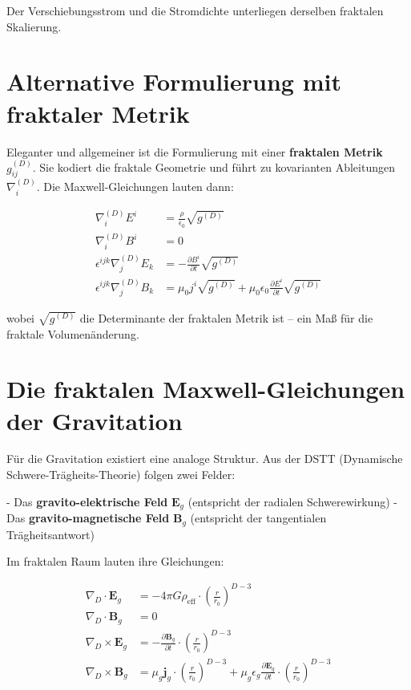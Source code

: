 \documentclass[12pt,a4paper]{article}
\begin{document}
Der Verschiebungsstrom und die Stromdichte unterliegen derselben fraktalen Skalierung.

\section{Alternative Formulierung mit fraktaler Metrik}

Eleganter und allgemeiner ist die Formulierung mit einer \textbf{fraktalen Metrik} \(g_{ij}^{(D)}\). Sie kodiert die fraktale Geometrie und führt zu kovarianten Ableitungen \(\nabla_i^{(D)}\). Die Maxwell-Gleichungen lauten dann:

\[
\begin{align}
\nabla_i^{(D)} E^i &= \frac{\rho}{\epsilon_0} \sqrt{g^{(D)}} \tag{1}\\
\nabla_i^{(D)} B^i &= 0 \tag{2}\\
\epsilon^{ijk} \nabla_j^{(D)} E_k &= -\frac{\partial B^i}{\partial t} \sqrt{g^{(D)}} \tag{3}\\
\epsilon^{ijk} \nabla_j^{(D)} B_k &= \mu_0 j^i \sqrt{g^{(D)}} + \mu_0 \epsilon_0 \frac{\partial E^i}{\partial t} \sqrt{g^{(D)}} \tag{4}
\end{align}
\]

wobei \(\sqrt{g^{(D)}}\) die Determinante der fraktalen Metrik ist – ein Maß für die fraktale Volumenänderung.

\section{Die fraktalen Maxwell-Gleichungen der Gravitation}

Für die Gravitation existiert eine analoge Struktur. Aus der DSTT (Dynamische Schwere-Trägheits-Theorie) folgen zwei Felder:

- Das \textbf{gravito-elektrische Feld} \(\mathbf{E}_g\) (entspricht der radialen Schwerewirkung)
- Das \textbf{gravito-magnetische Feld} \(\mathbf{B}_g\) (entspricht der tangentialen Trägheitsantwort)

Im fraktalen Raum lauten ihre Gleichungen:

\[
\begin{align}
\nabla_D \cdot \mathbf{E}_g &= -4\pi G \rho_{\text{eff}} \cdot \left( \frac{r}{r_0} \right)^{D-3} \tag{5}\\
\nabla_D \cdot \mathbf{B}_g &= 0 \tag{6}\\
\nabla_D \times \mathbf{E}_g &= -\frac{\partial \mathbf{B}_g}{\partial t} \cdot \left( \frac{r}{r_0} \right)^{D-3} \tag{7}\\
\nabla_D \times \mathbf{B}_g &= \mu_g \mathbf{j}_g \cdot \left( \frac{r}{r_0} \right)^{D-3} + \mu_g \epsilon_g \frac{\partial \mathbf{E}_g}{\partial t} \cdot \left( \frac{r}{r_0} \right)^{D-3} \tag{8}
\end{align}
\]
\end{document}
